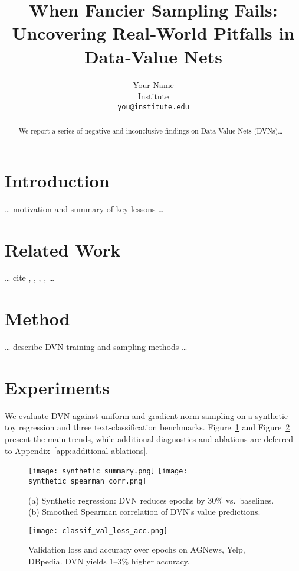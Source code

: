 \documentclass{article}
\title{When Fancier Sampling Fails: \\ Uncovering Real‐World Pitfalls in Data‐Value Nets}
\author{Your Name \\
Institute \\
\texttt{you@institute.edu}
}
\begin{document}
\maketitle

\begin{abstract}
We report a series of negative and inconclusive findings on Data‐Value Nets (DVNs)…
\end{abstract}

\section{Introduction}
… motivation and summary of key lessons …

\section{Related Work}
… cite \cite{jiang2021data}, \cite{sener2018active}, \cite{alain2016variance}, \cite{kendall2018multi}, \cite{gao2019consistency} …

\section{Method}
… describe DVN training and sampling methods …

\section{Experiments}
We evaluate DVN against uniform and gradient‐norm sampling on a synthetic toy regression and three text‐classification benchmarks.  Figure~\ref{fig:synthetic} and Figure~\ref{fig:classification} present the main trends, while additional diagnostics and ablations are deferred to Appendix~\ref{app:additional-ablations}.

\begin{figure}[t]
  \centering
  \texttt{[image: synthetic\_summary.png]}
  \texttt{[image: synthetic\_spearman\_corr.png]}
  \caption{(a) Synthetic regression: DVN reduces epochs by 30\% vs.\ baselines. (b) Smoothed Spearman correlation of DVN's value predictions.}
  \label{fig:synthetic}
\end{figure}

\begin{figure}[t]
  \centering
  \texttt{[image: classif\_val\_loss\_acc.png]}
  \caption{Validation loss and accuracy over epochs on AGNews, Yelp, DBpedia. DVN yields 1–3\% higher accuracy.}
  \label{fig:classification}
\end{figure}
\end{document}
